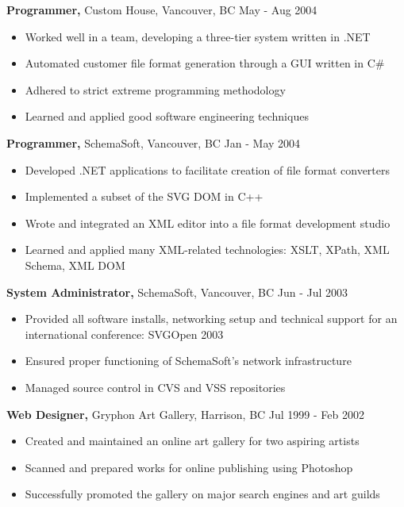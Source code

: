 \documentclass[11pt,margin,centered]{res}
\begin{document}
{\bf Programmer,} Custom House, Vancouver, BC \hfill May - Aug 2004
\begin{itemize} \itemsep -1pt  %
    \item Worked well in a team, developing a three-tier system
	written in .NET 
    \item Automated customer file format generation through a GUI
	written in C\#
    \item Adhered to strict extreme programming methodology
    \item Learned and applied good software engineering techniques
\end{itemize}

{\bf Programmer,} SchemaSoft, Vancouver, BC \hfill  Jan - May 2004
\begin{itemize} \itemsep -1pt %
    \item Developed .NET applications to facilitate creation of
	file format converters
    \item Implemented a subset of the SVG DOM in C++
    \item Wrote and integrated an XML editor into a file format development studio
    \item Learned and applied many XML-related technologies: XSLT,
	XPath, XML Schema, XML DOM
\end{itemize}

{\bf System Administrator,} SchemaSoft, Vancouver, BC \hfill Jun - Jul 2003
\begin{itemize} \itemsep -1pt
    \item Provided all software installs, networking setup and technical
	support for an international conference: SVGOpen 2003
    \item Ensured proper functioning of SchemaSoft's network infrastructure
    \item Managed source control in CVS and VSS repositories
\end{itemize}

{\bf Web Designer,} Gryphon Art Gallery, Harrison, BC \hfill Jul 1999 - Feb 2002
\begin{itemize} \itemsep -1pt
    \item Created and maintained an online art gallery for two aspiring
	artists
    \item Scanned and prepared works for online publishing using Photoshop
    \item Successfully promoted the gallery on major search engines and art
	guilds
\end{itemize}
\end{document}

